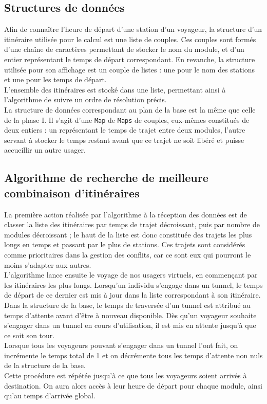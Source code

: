 \documentclass[11pt, a4paper, twoside, titlepage]{article}
\begin{document}
\subsection{Structures de données}

Afin de connaître l'heure de départ d'une station d'un voyageur, la structure d'un itinéraire utilisée pour le calcul est une liste de couples. Ces couples sont formés d'une chaîne de caractères permettant de stocker le nom du module, et d'un entier représentant le temps de départ correspondant. En revanche, la structure utilisée pour son affichage est un couple de listes : une pour le nom des stations et une pour les temps de départ.\\

L'ensemble des itinéraires est stocké dans une liste, permettant ainsi à l'algorithme de suivre un ordre de résolution précis.\\

La structure de données correspondant au plan de la base est la même que celle de la phase I. Il s'agit d'une \texttt{Map} de \texttt{Maps} de couples, eux-mêmes constitués de deux entiers : un représentant le temps de trajet entre deux modules, l'autre servant à stocker le temps restant avant que ce trajet ne soit libéré et puisse accueillir un autre usager.


\subsection{Algorithme de recherche de meilleure combinaison d'itinéraires}

La première action réalisée par l'algorithme à la réception des données est de classer la liste des itinéraires par temps de trajet décroissant, puis par nombre de modules décroissant ; le haut de la liste est donc constituée des trajets les plus longs en temps et passant par le plus de stations. Ces trajets sont considérés comme prioritaires dans la gestion des conflits, car ce sont eux qui pourront le moins s'adapter aux autres.\\
L'algorithme lance ensuite le voyage de nos usagers virtuels, en commençant par les itinéraires les plus longs. Lorsqu'un individu s'engage dans un tunnel, le temps de départ de ce dernier est mis à jour dans la liste correspondant à son itinéraire. Dans la structure de la base, le temps de traversée d'un tunnel est attribué au temps d'attente avant d'être à nouveau disponible. Dès qu'un voyageur souhaite s'engager dans un tunnel en cours d'utilisation, il est mis en attente jusqu'à que ce soit son tour.\\
Lorsque tous les voyageurs pouvant s'engager dans un tunnel l'ont fait, on incrémente le temps total de 1 et on décrémente tous les temps d'attente non nuls de la structure de la base.\\
Cette procédure est répétée jusqu'à ce que tous les voyageurs soient arrivés à destination. On aura alors accès à leur heure de départ pour chaque module, ainsi qu'au temps d'arrivée global.\\
\end{document}
